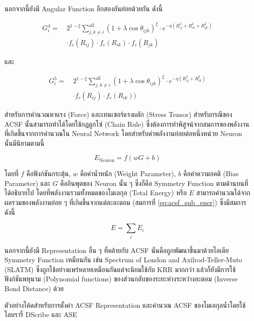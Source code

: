 นอกจากนี้ยังมี Angular Function อีกสองอันย่อยด้วยกัน ดังนี้

\begin{align}\label{eq:rf_g4}
    G^{4}_{i} =~&2^{1 - \xi}\sum^{\text{all}}_{j,k \neq i} (1+\lambda \cos \theta_{ijk})^{\xi}
    \cdot e^{-\eta(R^{2}_{ij} + R^{2}_{ik} + R^{2}_{jk})} \nonumber \\
    & \cdot f_{c}(R_{ij}) \cdot f_{c}(R_{ik}) \cdot f_{c}(R_{jk})
\end{align}

\noindent และ

\begin{align}\label{eq:rf_g5}
    G^{5}_{i} =~&2^{1 - \xi}\sum^{\text{all}}_{j,k \neq i} (1+\lambda \cos \theta_{ijk})^{\xi}
    \cdot e^{-\eta(R^{2}_{ij} + R^{2}_{ik})} \nonumber \\
    & \cdot f_{c}(R_{ij}) \cdot f_{c}(R_{ik}))
\end{align}

สำหรับการคำนวณหาแรง (Force) และเทนเซอร์แรงผลัก (Stress Tensor) สำหรับกรณีของ ACSF นั้นสามารถทำได้โดยใช้กฎลูกโซ่ (Chain 
Rule) ซึ่งต้องการทำพิสูจน์จากสมการของพลังงานที่เกิดขึ้นจากการคำนวณใน Neural Network โดยสำหรับค่าพลังงานย่อยต่อหนึ่งหน่วย Neuron 
นั้นมีนิยามตามนี้

\begin{equation}\label{eq:acsf_sub_ener}
    E_{\text{Neuron}} = f(w G + b) 
\end{equation}

\noindent โดยที่ $f$ คือฟังก์ชันกระตุ้น, $w$ คือค่าน้ำหนัก (Weight Parameter), $b$ คือค่าความอคติ (Bias Parameter) และ $G$ 
คืออินพุตของ Neuron นั้น ๆ ซึ่งก็คือ Symmetry Function ตามด้านบนที่ได้อธิบายไป โดยที่พลังงานรวมทั้งหมดของโมเลกุล (Total Energy) 
หรือ $E$ สามารถคำนวณได้จากผลรวมของพลังงานย่อย ๆ ที่เกิดขึ้นจากแต่ละอะตอม (สมการที่ \ref{eq:acsf_sub_ener}) ซึ่งมีสมการดังนี้

\begin{equation}
    E = \sum_{i} E_{i}
\end{equation}

นอกจากนี้ยังมี Representation อื่น ๆ ที่คล้ายกับ ACSF นั่นคือถูกพัฒนาขึ้นมาด้วยไอเดีย Symmetry Function เหมือนกัน เช่น 
Spectrum of London and Axilrod-Teller-Muto (SLATM) ซึ่งถูกใช้อย่างแพร่หลายเหมือนกันแต่จะนิยมใช้กับ KRR มากกว่า%
\autocite{faber2018,huang2020} แล้วก็ยังมีการใช้ฟังก์ชันพหุนาม (Polynomial functions) ของส่วนกลับของระยะห่างระหว่างอะตอม
(Inverse Bond Distance) ด้วย\autocite{kwac2019,musil2021}

ตัวอย่างโค้ดสำหรับการตั้งค่า ACSF Representation และคำนวณ ACSF ของโมเลกุลน้ำโดยใช้ไลบรารี่ DScribe และ ASE


